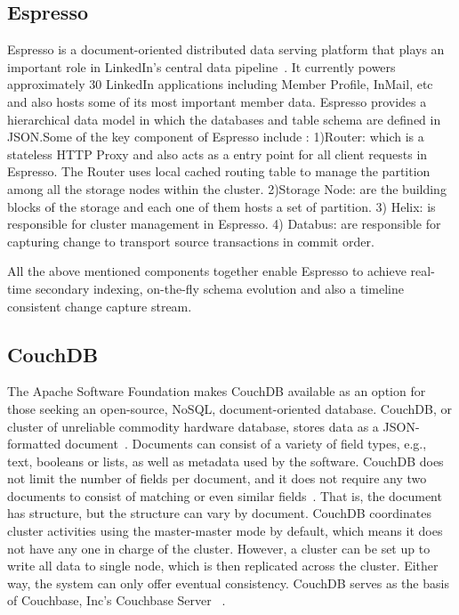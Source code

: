 \subsection{Espresso}

Espresso is a document-oriented distributed data serving platform that
plays an important role in LinkedIn's central data
pipeline~\cite{www-Linkedin-Espresso}.  It currently powers
approximately 30 LinkedIn applications including Member Profile,
InMail, etc and also hosts some of its most important member
data. Espresso provides a hierarchical data model in which the
databases and table schema are defined in JSON.Some of the key
component of Espresso include : 1)Router: which is a stateless HTTP
Proxy and also acts as a entry point for all client requests in
Espresso. The Router uses local cached routing table to manage the
partition among all the storage nodes within the cluster. 2)Storage
Node: are the building blocks of the storage and each one of them
hosts a set of partition. 3) Helix: is responsible for cluster
management in Espresso. 4) Databus: are responsible for capturing
change to transport source transactions in commit order.

     All the above mentioned components together enable Espresso to achieve 
     real-time secondary indexing, on-the-fly schema evolution and also a 
     timeline consistent change capture stream.

     \pv

\subsection{CouchDB \cv}
     
The Apache Software Foundation makes CouchDB available as an option
for those seeking an open-source, NoSQL, document-oriented
database. CouchDB, or cluster of unreliable commodity hardware
database, stores data as a JSON-formatted
document~\cite{www-exploringcdb-couchdb}.  Documents can consist of a
variety of field types, e.g., text, booleans or lists, as well as
metadata used by the software. CouchDB does not limit the number of
fields per document, and it does not require any two documents to
consist of matching or even similar
fields~\cite{www-techoverview-couchdb}. That is, the document has
structure, but the structure can vary by document.  CouchDB
coordinates cluster activities using the master-master mode by
default, which means it does not have any one in charge of the
cluster.  However, a cluster can be set up to write all data to single
node, which is then replicated across the cluster.  Either way, the
system can only offer eventual consistency. CouchDB serves as the
basis of Couchbase, Inc's Couchbase Server
~\cite{www-cdb-vs-cbs-couchdb}.

